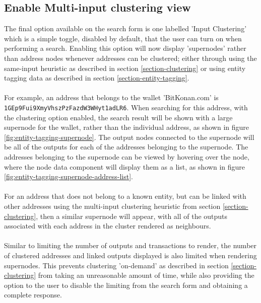 \subsection{Enable Multi-input clustering view}
The final option available on the search form is one labelled 'Input Clustering' which is a simple toggle, disabled by default, that the user can turn on when performing a search. Enabling this option will now display 'supernodes' rather than address nodes whenever addresses can be clustered; either through using the same-input heuristic as described in section \ref{section-clustering} or using entity tagging data as described in section \ref{section-entity-tagging}.
\\\\
For example, an address that belongs to the wallet 'BitKonan.com' is \\\texttt{1GEp9Fui9XmyVhszPzFazdW3WHyt1adLR6}. When searching for this address, with the clustering option enabled, the search result will be shown with a large supernode for the wallet, rather than the individual address, as shown in figure \ref{fig:entity-tagging-supernode}. The output nodes connected to the supernode will be all of the outputs for each of the addresses belonging to the supernode. The addresses belonging to the supernode can be viewed by hovering over the node, where the node data component will display them as a list, as shown in figure \ref{fig:entity-tagging-supernode-address-list}.
\\\\
For an address that does not belong to a known entity, but can be linked with other addresses using the multi-input clustering heuristic from section \ref{section-clustering}, then a similar supernode will appear, with all of the outputs associated with each address in the cluster rendered as neighbours. 
\\\\
Similar to limiting the number of outputs and transactions to render, the number of clustered addresses and linked outputs displayed is also limited when rendering supernodes. This prevents clustering 'on-demand' as described in section \ref{section-clustering} from taking an unreasonable amount of time, while also providing the option to the user to disable the limiting from the search form and obtaining a complete response. 

